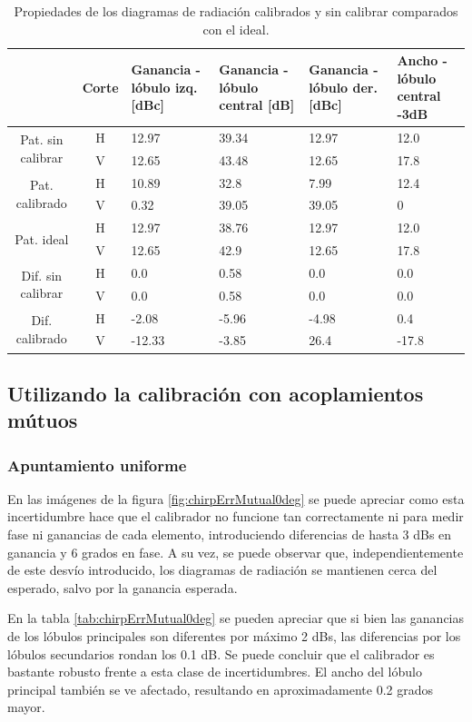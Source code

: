 \begin{table}[H]
  \footnotesize
  \centering
  \begin{tabular}{|c|c|p{2cm}|p{2.5cm}|p{2.5cm}|p{2.5cm}|}
    \cline{2-6}
    \multicolumn{1}{c|}{} & Corte & Ganancia - lóbulo izq. [dBc] & Ganancia - lóbulo central [dB] &
    Ganancia - lóbulo der. [dBc] & Ancho - lóbulo central -3dB \tabularnewline\hline
    \multirow{2}{2cm}{Pat. sin calibrar} & H & 12.97 & 39.34 & 12.97 & 12.0 \tabularnewline\cline{2-6}
     & V & 12.65 & 43.48 & 12.65 & 17.8 \tabularnewline\hline
    \multirow{2}{2cm}{Pat. calibrado} & H & 10.89 & 32.8 & 7.99 & 12.4 \tabularnewline\cline{2-6}
     & V & 0.32 & 39.05 & 39.05 & 0 \tabularnewline\hline
    \multirow{2}{2cm}{Pat. ideal} & H & 12.97 & 38.76 & 12.97 & 12.0 \tabularnewline\cline{2-6}
     & V & 12.65 & 42.9 & 12.65 & 17.8 \tabularnewline\hline
    \multirow{2}{2cm}{Dif. sin calibrar} & H & 0.0 & 0.58 & 0.0 & 0.0\tabularnewline\cline{2-6}
     & V & 0.0 & 0.58 & 0.0 & 0.0 \tabularnewline\hline
    \multirow{2}{2cm}{Dif. calibrado} & H & -2.08 & -5.96 & -4.98 & 0.4 \tabularnewline\cline{2-6}
     & V & -12.33 & -3.85 & 26.4 & -17.8 \tabularnewline\hline
  \end{tabular}
  \caption{Propiedades de los diagramas de radiación calibrados y sin calibrar comparados con el ideal.}
  \label{tab:chirpErrClassical10degRow}
\end{table}


\subsection{Utilizando la calibración con acoplamientos mútuos}

\subsubsection{Apuntamiento uniforme}

En las imágenes de la figura \ref{fig:chirpErrMutual0deg} se puede apreciar como esta incertidumbre hace que el calibrador 
no funcione tan correctamente ni para medir fase ni ganancias de cada elemento, introduciendo diferencias de hasta 3 dBs en 
ganancia y 6 grados en fase. A su vez, se puede observar que, independientemente de este desvío introducido, los diagramas de 
radiación se mantienen cerca del esperado, salvo por la ganancia esperada.

En la tabla \ref{tab:chirpErrMutual0deg} se pueden apreciar que si bien las ganancias de los lóbulos principales son 
diferentes por máximo 2 dBs, las diferencias por los lóbulos secundarios rondan los 0.1 dB. Se puede concluir que el 
calibrador es bastante robusto frente a esta clase de incertidumbres. El ancho del lóbulo principal también se ve afectado,
resultando en aproximadamente 0.2 grados mayor.

